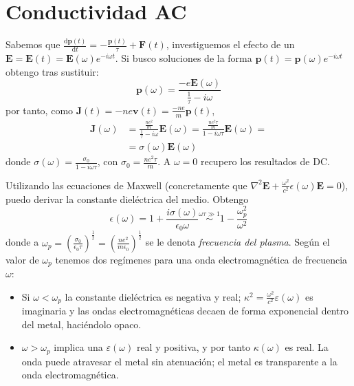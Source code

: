 \section{Conductividad AC}
Sabemos que
$\frac{\text{d}\mathbf{p}(t)}{\text{d}t} = -
\frac{\mathbf{p}(t)}{\tau} + \mathbf{F}(t)$,
investiguemos el efecto de un
$\mathbf{E} = \mathbf{E}(t) = \mathbf{E}(\omega) e^{-i\omega t}$. Si
busco soluciones de la forma
$\mathbf{p}(t) = \mathbf{p}(\omega) e^{-i\omega t}$ obtengo tras
sustituir:
\begin{equation}
  \mathbf{p}(\omega) = \frac{-e \mathbf{E}(\omega)}{\frac{1}{\tau}- i\omega}
\end{equation}
por tanto, como $\mathbf{J}(t) = -n e \mathbf{v}(t) = \frac{-ne}{m}
\mathbf{p}(t)$,
\begin{equation}
\begin{split}
  \mathbf{J}(\omega) &= \frac{\frac{ne^2}{m}}{\frac{1}{\tau}-i\omega}
  \mathbf{E}(\omega) = \frac{\frac{ne^2\tau}{m}}{1-i\omega \tau}
  \mathbf{E}(\omega) = \\ &= \sigma(\omega) \mathbf{E}(\omega)
\end{split}
\end{equation}
donde $\sigma(\omega) = \frac{\sigma_0}{1-i\omega \tau}$, con
$\sigma_0 = \frac{ne^2\tau}{m}$. A $\omega = 0$ recupero los
resultados de DC.

Utilizando las ecuaciones de Maxwell (concretamente que $\nabla^2
\mathbf{E} + \frac{\omega^2}{c^2} \epsilon(\omega) \mathbf{E} = 0$), puedo derivar la constante
dieléctrica del medio. Obtengo
\begin{equation}
  \epsilon(\omega) = 1 + \frac{i \sigma(\omega)}{\epsilon_0 \omega}
  \stackrel{\omega\tau \gg 1}{\sim} 1 - \frac{\omega_p^2}{\omega^2}
\end{equation}
donde a $\omega_p = \left( \frac{\sigma_0}{\epsilon_0 \tau}
\right)^{\frac{1}{2}} = \left( \frac{ne^2}{m\epsilon_0}
\right)^{\frac{1}{2}}$ se le denota \emph{frecuencia del
  plasma}. Según el valor de $\omega_p$ tenemos dos regímenes para una
onda electromagnética de frecuencia $\omega$:
\begin{itemize}
\item Si $ \omega < \omega_p$ la constante dieléctrica es negativa y
  real; $\kappa^2 = \frac{\omega^2}{c^2} \varepsilon(\omega)$ es imaginaria y las ondas electromagnéticas decaen de
  forma exponencial dentro del metal, haciéndolo opaco.
\item $\omega > \omega_p$ implica una $\varepsilon(\omega)$
real y positiva, y por tanto $\kappa(\omega)$ es real. La onda puede
atravesar el metal sin atenuación; el metal es transparente a la onda electromagnética.
\end{itemize}

